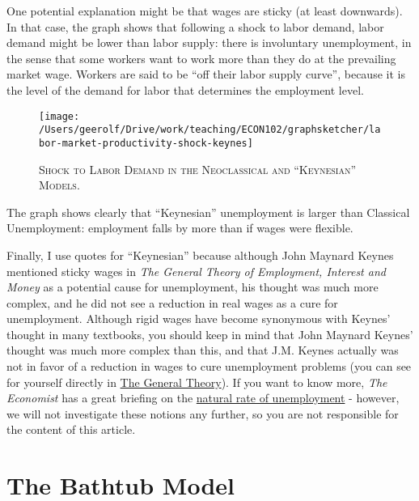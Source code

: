 \documentclass[]{book}
\theoremstyle{definition}
\theoremstyle{definition}
\theoremstyle{definition}
\theoremstyle{remark}
\begin{document}
One potential explanation might be that wages are sticky (at least
downwards). In that case, the graph shows that following a shock to
labor demand, labor demand might be lower than labor supply: there is
involuntary unemployment, in the sense that some workers want to work
more than they do at the prevailing market wage. Workers are said to be
``off their labor supply curve'', because it is the level of the demand
for labor that determines the employment level.




\begin{figure}

{\centering \texttt{[image: /Users/geerolf/Drive/work/teaching/ECON102/graphsketcher/labor-market-productivity-shock-keynes]} 

}

\caption{\textsc{Shock to Labor Demand in the
Neoclassical and ``Keynesian'' Models}.}\label{fig:shock-labor-demand}
\end{figure}

The graph shows clearly that ``Keynesian'' unemployment is larger than
Classical Unemployment: employment falls by more than if wages were
flexible.

Finally, I use quotes for ``Keynesian'' because although John Maynard
Keynes mentioned sticky wages in \emph{The General Theory of Employment,
Interest and Money} as a potential cause for unemployment, his thought
was much more complex, and he did not see a reduction in real wages as a
cure for unemployment. Although rigid wages have become synonymous with
Keynes' thought in many textbooks, you should keep in mind that John
Maynard Keynes' thought was much more complex than this, and that J.M.
Keynes actually was not in favor of a reduction in wages to cure
unemployment problems (you can see for yourself directly in
\href{http://cas2.umkc.edu/economics/people/facultypages/kregel/courses/econ645/winter2011/generaltheory.pdf}{The
General Theory}). If you want to know more, \emph{The Economist} has a
great briefing on the
\href{https://www.economist.com/economics-brief/2017/08/26/the-natural-rate-of-unemployment}{natural
rate of unemployment} - however, we will not investigate these notions
any further, so you are not responsible for the content of this article.

\hypertarget{bathtub}{\section{The Bathtub Model}\label{bathtub}}
\end{document}
